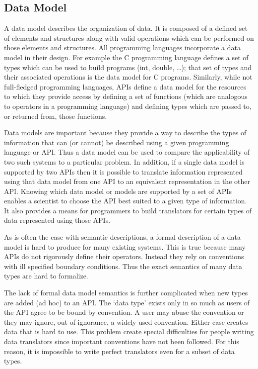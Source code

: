 \subsection{Data Model}
\label{data-models}

A data model describes the organization of data. It is composed of a defined
set of elements and structures along with valid operations which can be
performed on those elements and structures. All programming languages
incorporate a data model in their design. For example the C programming
language defines a set of types which can be used to build programs (int,
double, \ldots); that set of types and their associated operations is the
data model for C programs.  Similarly, while not full-fledged programming
languages, APIs define a data model for the resources to which they provide
access by defining a set of functions (which are analogous to operators in a
programming language) and defining types which are passed to, or returned
from, those functions.

Data models are important because they provide a way to describe the types of
information that can (or cannot) be described using a given programming
language or API\@. Thus a data model can be used to compare the applicability
of two such systems to a particular problem. In addition, if a single data
model is supported by two APIs then it is possible to translate information
represented using that data model from one API to an equivalent
representation in the other API\@. Knowing which data model or models are
supported by a set of APIs enables a scientist to choose the API best suited
to a given type of information. It also provides a means for programmers to
build translators for certain types of data represented using those APIs.

As is often the case with semantic descriptions, a formal description of a
data model is hard to produce for many existing systems. This is true because
many APIs do not rigorously define their operators. Instead they rely on
conventions with ill specified boundary conditions. Thus the exact semantics
of many data types are hard to formalize.

The lack of formal data model semantics is further complicated when new types
are added (ad hoc) to an API\@. The `data type' exists only in so much as users
of the API agree to be bound by convention. A user may abuse the convention
or they may ignore, out of ignorance, a widely used convention. Either case
creates data that is hard to use. This problem create special difficulties
for people writing data translators since important conventions have not been
followed. For this reason, it is impossible to write perfect translators even
for a subset of data types.

